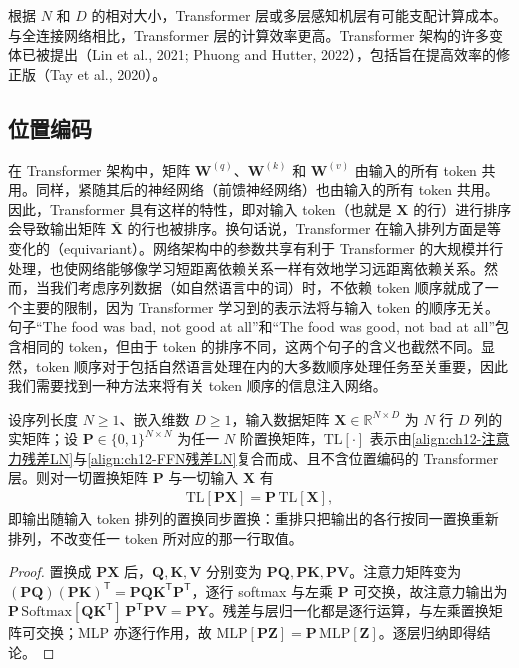 \documentclass[../../main.tex]{subfiles}
\begin{document}
根据 $N$ 和 $D$ 的相对大小，Transformer 层或多层感知机层有可能支配计算成本。与全连接网络相比，Transformer 层的计算效率更高。Transformer 架构的许多变体已被提出（Lin et al., 2021; Phuong and Hutter, 2022），包括旨在提高效率的修正版（Tay et al., 2020）。

\subsection{位置编码}\label{subsection:ch12-位置编码}

在 Transformer 架构中，矩阵 $\mathbf{W}^{(q)}$、$\mathbf{W}^{(k)}$ 和 $\mathbf{W}^{(v)}$ 由输入的所有 token 共用。同样，紧随其后的神经网络（前馈神经网络）也由输入的所有 token 共用。因此，Transformer 具有这样的特性，即对输入 token（也就是 $\mathbf{X}$ 的行）进行排序会导致输出矩阵 $\bar{\mathbf{X}}$ 的行也被排序。换句话说，Transformer 在输入排列方面是等变化的（equivariant）。网络架构中的参数共享有利于 Transformer 的大规模并行处理，也使网络能够像学习短距离依赖关系一样有效地学习远距离依赖关系。然而，当我们考虑序列数据（如自然语言中的词）时，不依赖 token 顺序就成了一个主要的限制，因为 Transformer 学习到的表示法将与输入 token 的顺序无关。句子“The food was bad, not good at all”和“The food was good, not bad at all”包含相同的 token，但由于 token 的排序不同，这两个句子的含义也截然不同。显然，token 顺序对于包括自然语言处理在内的大多数顺序处理任务至关重要，因此我们需要找到一种方法来将有关 token 顺序的信息注入网络。

\begin{proposition}\label{proposition:ch12-排列等变}
设序列长度 $N\geqslant1$、嵌入维数 $D\geqslant1$，输入数据矩阵 $\mathbf{X}\in\mathbb{R}^{N\times D}$ 为 $N$ 行 $D$ 列的实矩阵；设 $\mathbf{P}\in\{0,1\}^{N\times N}$ 为任一 $N$ 阶置换矩阵，$\mathrm{TL}[\cdot]$ 表示由\eqref{align:ch12-注意力残差LN}与\eqref{align:ch12-FFN残差LN}复合而成、且不含位置编码的 Transformer 层。则对一切置换矩阵 $\mathbf{P}$ 与一切输入 $\mathbf{X}$ 有
\begin{align*}
\mathrm{TL}[\mathbf{P}\mathbf{X}]=\mathbf{P}\,\mathrm{TL}[\mathbf{X}],
\end{align*}
即输出随输入 token 排列的置换同步置换：重排只把输出的各行按同一置换重新排列，不改变任一 token 所对应的那一行取值。
\end{proposition}

\begin{proof}
置换成 $\mathbf{PX}$ 后，$\mathbf{Q},\mathbf{K},\mathbf{V}$ 分别变为 $\mathbf{PQ},\mathbf{PK},\mathbf{PV}$。注意力矩阵变为 $(\mathbf{PQ})(\mathbf{PK})^{\mathsf{T}}=\mathbf{P}\mathbf{Q}\mathbf{K}^{\mathsf{T}}\mathbf{P}^{\mathsf{T}}$，逐行 softmax 与左乘 $\mathbf{P}$ 可交换，故注意力输出为 $\mathbf{P}\,\mathrm{Softmax}[\mathbf{Q}\mathbf{K}^{\mathsf{T}}]\,\mathbf{P}^{\mathsf{T}}\mathbf{PV}=\mathbf{P}\mathbf{Y}$。残差与层归一化都是逐行运算，与左乘置换矩阵可交换；MLP 亦逐行作用，故 $\mathrm{MLP}[\mathbf{P}\mathbf{Z}]=\mathbf{P}\,\mathrm{MLP}[\mathbf{Z}]$。逐层归纳即得结论。
\end{proof}
\end{document}
